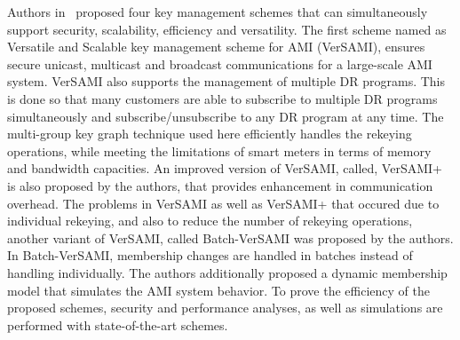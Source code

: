 \par Authors in~\cite{Ben18} proposed four key management schemes that can simultaneously support security, scalability, efficiency and versatility. The first scheme named as Versatile and Scalable key management scheme for AMI (VerSAMI), ensures secure unicast, multicast and broadcast communications for a large-scale AMI system. VerSAMI also supports the management of multiple DR programs. This is done so that many customers are able to subscribe to multiple DR programs simultaneously and subscribe/unsubscribe to any DR program at any time. The multi-group key graph technique used here efficiently handles the rekeying operations, while meeting the limitations of smart meters in terms of memory and bandwidth capacities. An improved version of VerSAMI, called, VerSAMI+ is also proposed by the authors, that provides enhancement in communication overhead. The problems in VerSAMI as well as VerSAMI+ that occured due to individual rekeying, and also to reduce the number of rekeying operations, another variant of VerSAMI, called Batch-VerSAMI was proposed by the authors. In Batch-VerSAMI, membership changes are handled in batches instead of handling individually. The authors additionally proposed a dynamic membership model that simulates the AMI system behavior. To prove the efficiency of the proposed schemes, security and performance analyses, as well as simulations are performed with state-of-the-art schemes.

